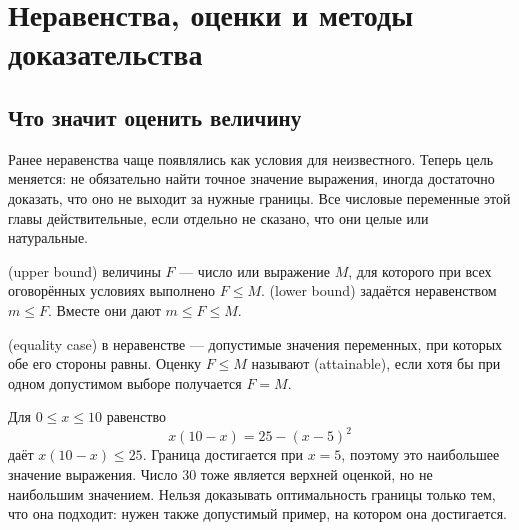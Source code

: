 \chapter{Неравенства, оценки и методы доказательства}\label{chap:c17}
\section{Что значит оценить величину}
Ранее неравенства чаще появлялись как условия для неизвестного. Теперь цель меняется: не обязательно найти точное значение выражения, иногда достаточно доказать, что оно не выходит за нужные границы. Все числовые переменные этой главы действительные, если отдельно не сказано, что они целые или натуральные.

\begin{definition}
 (upper bound) величины \(F\) — число или выражение \(M\), для которого при всех оговорённых условиях выполнено \(F\le M\).  (lower bound) задаётся неравенством \(m\le F\). Вместе они дают \(m\le F\le M\).
\end{definition}
\begin{definition}
 (equality case) в неравенстве — допустимые значения переменных, при которых обе его стороны равны. Оценку \(F\le M\) называют  (attainable), если хотя бы при одном допустимом выборе получается \(F=M\).
\end{definition}
Для \(0\le x\le10\) равенство
\[
x(10-x)=25-(x-5)^2
\]
даёт \(x(10-x)\le25\). Граница достигается при \(x=5\), поэтому это наибольшее значение выражения. Число \(30\) тоже является верхней оценкой, но не наибольшим значением. Нельзя доказывать оптимальность границы только тем, что она подходит: нужен также допустимый пример, на котором она достигается.

